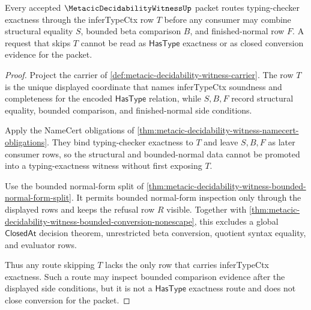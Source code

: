 \begin{theorem}
\label{thm:metacic-decidability-witness-typing-exactness-route}
Every accepted $\MetacicDecidabilityWitnessUp$ packet routes typing-checker exactness through the inferTypeCtx row $T$ before any consumer may combine structural equality $S$, bounded beta comparison $B$, and finished-normal row $F$. A request that skips $T$ cannot be read as $\mathsf{HasType}$ exactness or as closed conversion evidence for the packet.
\end{theorem}
\begin{proof}
Project the carrier of \autoref{def:metacic-decidability-witness-carrier}. The row $T$ is the unique displayed coordinate that names inferTypeCtx soundness and completeness for the encoded $\mathsf{HasType}$ relation, while $S,B,F$ record structural equality, bounded comparison, and finished-normal side conditions.

Apply the NameCert obligations of \autoref{thm:metacic-decidability-witness-namecert-obligations}. They bind typing-checker exactness to $T$ and leave $S,B,F$ as later consumer rows, so the structural and bounded-normal data cannot be promoted into a typing-exactness witness without first exposing $T$.

Use the bounded normal-form split of \autoref{thm:metacic-decidability-witness-bounded-normal-form-split}. It permits bounded normal-form inspection only through the displayed rows and keeps the refusal row $R$ visible. Together with \autoref{thm:metacic-decidability-witness-bounded-conversion-nonescape}, this excludes a global $\mathsf{ClosedAt}$ decision theorem, unrestricted beta conversion, quotient syntax equality, and evaluator rows.

Thus any route skipping $T$ lacks the only row that carries inferTypeCtx exactness. Such a route may inspect bounded comparison evidence after the displayed side conditions, but it is not a $\mathsf{HasType}$ exactness route and does not close conversion for the packet.
\end{proof}

